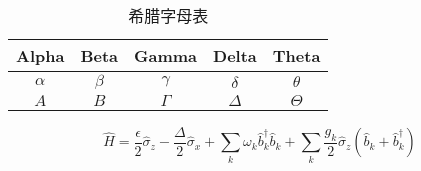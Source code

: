 \begin{table}[H]
	\begin{center}
		\caption{希腊字母表\label{tab:appB}}
		\begin{tabular}{|c|c|c|c|c|}
			\hline
			Alpha & Beta & Gamma & Delta & Theta\\
			\hline
			$\alpha$ & $\beta$ & $\gamma$ & $\delta$ & $\theta$\\
			\hline
			$A$ & $B$ & $\Gamma$ & $\Delta$ & $\Theta$\\
			\hline
		\end{tabular}
	\end{center}
\end{table}

\begin{equation}
	\hat{H}=\frac{\epsilon}{2}\hat{\sigma}_{z}-\frac{\Delta}{2}\hat{\sigma}_{x}+\sum_{k}\omega_{k}\hat{b}_{k}^{\dagger}\hat{b}_{k}+\sum_{k}\frac{g_{k}}{2}\hat{\sigma}_{z}(\hat{b}_{k}+\hat{b}_{k}^{\dagger})\label{eq:appB}
\end{equation}